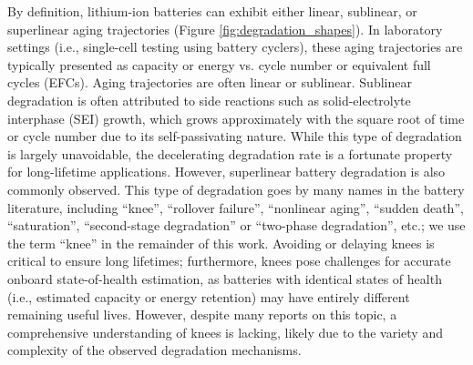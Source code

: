 \documentclass[journal=jpclcd,manuscript=article]{achemso}
\begin{document}
By definition, lithium-ion batteries can exhibit either linear, sublinear, or superlinear aging trajectories (Figure \ref{fig:degradation_shapes}). In laboratory settings (i.e., single-cell testing using battery cyclers), these aging trajectories are typically presented as capacity or energy vs. cycle number or equivalent full cycles (EFCs). Aging trajectories are often linear\cite{ma_editors_2019, keil_electrochemical_2020,  preger_degradation_2020} or sublinear\cite{bloom_accelerated_2001, broussely_aging_2001, wright_calendar-_2002, smith_high_2011, attia_revisiting_2020}. Sublinear degradation is often attributed to side reactions such as solid-electrolyte interphase (SEI) growth, which grows approximately with the square root of time or cycle number due to its self-passivating nature.\cite{bloom_accelerated_2001, broussely_aging_2001, wright_calendar-_2002, smith_high_2011, attia_revisiting_2020} While this type of degradation is largely unavoidable, the decelerating degradation rate is a fortunate property for long-lifetime applications. However, superlinear battery degradation is also commonly observed. This type of degradation goes by many names in the battery literature, including ``knee''\cite{diao_algorithm_2019, fermin-cueto_identification_2020}, ``rollover failure''\cite{ma_editors_2019}, ``nonlinear aging''\cite{schuster_nonlinear_2015, bach_nonlinear_2016, yang_modeling_2017, mandli_analysis_2019, keil_linear_2019, keil_electrochemical_2020, atalay_theory_2020}, ``sudden death''\cite{muller_model-based_2019, willenberg_development_2020, kupper_end--life_2018}, ``saturation''\cite{lin_comprehensive_2013}, ``second-stage degradation''\cite{dubarry_perspective_2020} or ``two-phase degradation''\cite{pugalenthi_piecewise_2020}, etc.; we use the term ``knee'' in the remainder of this work. Avoiding or delaying knees is critical to ensure long lifetimes; furthermore, knees pose challenges for accurate onboard state-of-health estimation, as batteries with identical states of health (i.e., estimated capacity or energy retention) may have entirely different remaining useful lives\cite{dubarry_perspective_2020}. However, despite many reports on this topic, a comprehensive understanding of knees is lacking, likely due to the variety and complexity of the observed degradation mechanisms.
\end{document}
